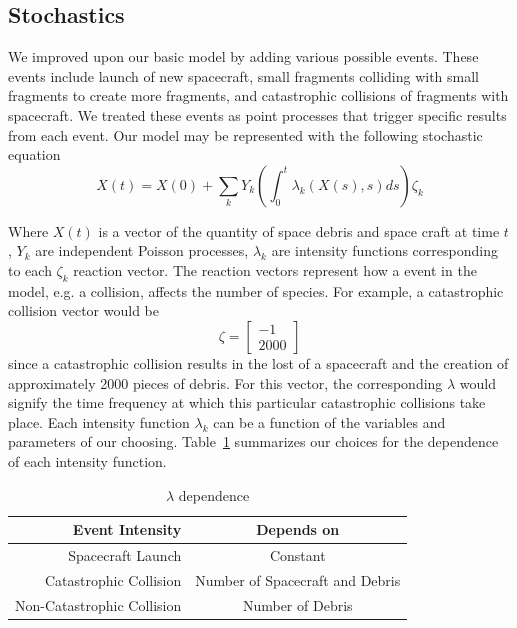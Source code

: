 \documentclass[pre,12pt]{revtex4-1}
\begin{document}
\subsection{Stochastics}
We improved upon our basic model by adding various possible events. These events include launch of new spacecraft, small fragments colliding with small fragments to create more fragments, and catastrophic collisions of fragments with spacecraft. We treated these events as point processes that trigger specific results from each event.
Our model may be represented with the following stochastic equation
\begin{equation}
	X(t) = X(0) + \sum_k Y_k \left(\int_0^t \lambda_k(X(s),s)ds\right) \zeta_k
\end{equation}

Where $X(t)$ is a vector of the quantity of space debris and space craft at time $t$, $Y_k$ are independent Poisson processes, $\lambda_k$ are intensity functions corresponding to each $\zeta_k$ reaction vector. The reaction vectors represent how a event in the model, e.g. a collision, affects the number of species. For example, a catastrophic collision vector would be
\begin{equation}
	\zeta = \begin{bmatrix} -1 \\ 2000 \end{bmatrix}
\end{equation}
since a catastrophic collision results in the lost of a spacecraft and the creation of approximately 2000 pieces of debris. For this vector, the corresponding $\lambda$ would signify the time frequency at which this particular catastrophic collisions take place. Each intensity function $\lambda_k$ can be a function of the variables and parameters of our choosing. Table~\ref{tab:lambdas} summarizes our choices for the dependence of each intensity function.

\begin{table}[h]
\centering
\begin{tabular}{r | c}
	Event Intensity & Depends on \\ \hline \hline
	Spacecraft Launch & Constant \\ \hline
	Catastrophic Collision & Number of Spacecraft and Debris \\ \hline
	Non-Catastrophic Collision & Number of Debris \\ \hline
\end{tabular}
\caption{$\lambda$ dependence}
\label{tab:lambdas}
\end{table}
\end{document}
